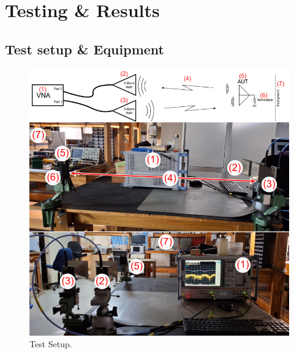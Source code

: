 %
%
%
\ifstandalone
\tableofcontents
\fi
\chapter{Testing \& Results \label{ch:results}}
\vspace{0.5cm}



\section{Test setup \& Equipment}

    \begin{figure}[H]
    \centering
    \includegraphics[width=0.9\linewidth]{Figures/chp4_setup.png}
    \caption{Test Setup.}
    \label{fig:chp4_setup}
    \end{figure}

